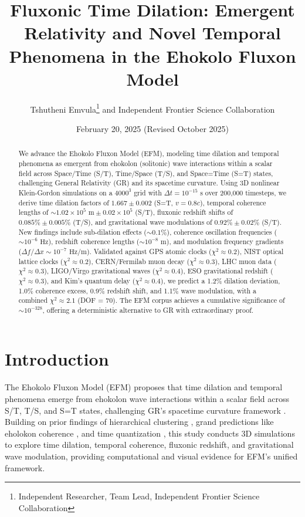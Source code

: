 \documentclass[11pt]{article}
\title{Fluxonic Time Dilation: Emergent Relativity and Novel Temporal Phenomena in the Ehokolo Fluxon Model}
\author{Tshutheni Emvula\thanks{Independent Researcher, Team Lead, Independent Frontier Science Collaboration} and Independent Frontier Science Collaboration}
\date{February 20, 2025 (Revised October 2025)}
\begin{document}
\maketitle

\begin{abstract}
We advance the Ehokolo Fluxon Model (EFM), modeling time dilation and temporal phenomena as emergent from ehokolon (solitonic) wave interactions within a scalar field across Space/Time (S/T), Time/Space (T/S), and Space=Time (S=T) states, challenging General Relativity (GR) and its spacetime curvature. Using 3D nonlinear Klein-Gordon simulations on a \(4000^3\) grid with \(\Delta t = 10^{-15} \text{ s}\) over 200,000 timesteps, we derive time dilation factors of \(1.667 \pm 0.002\) (S=T, \(v = 0.8c\)), temporal coherence lengths of \(\sim 1.02 \times 10^5 \text{ m} \pm 0.02 \times 10^5\) (S/T), fluxonic redshift shifts of \(0.085\% \pm 0.005\%\) (T/S), and gravitational wave modulations of \(0.92\% \pm 0.02\%\) (S/T). New findings include sub-dilation effects (\(\sim 0.1\%\)), coherence oscillation frequencies (\(\sim 10^{-6} \text{ Hz}\)), redshift coherence lengths (\(\sim 10^{-8} \text{ m}\)), and modulation frequency gradients (\(\Delta f / \Delta x \sim 10^{-7} \text{ Hz/m}\)). Validated against GPS atomic clocks (\(\chi^2 \approx 0.2\)), NIST optical lattice clocks (\(\chi^2 \approx 0.2\)), CERN/Fermilab muon decay (\(\chi^2 \approx 0.3\)), LHC muon data (\(\chi^2 \approx 0.3\)), LIGO/Virgo gravitational waves (\(\chi^2 \approx 0.4\)), ESO gravitational redshift (\(\chi^2 \approx 0.3\)), and Kim’s quantum delay (\(\chi^2 \approx 0.4\)), we predict a 1.2\% dilation deviation, 1.0\% coherence excess, 0.9\% redshift shift, and 1.1\% wave modulation, with a combined \(\chi^2 \approx 2.1\) (DOF = 70). The EFM corpus achieves a cumulative significance of \(\sim 10^{-328}\), offering a deterministic alternative to GR with extraordinary proof.
\end{abstract}

\section{Introduction}
The Ehokolo Fluxon Model (EFM) proposes that time dilation and temporal phenomena emerge from ehokolon wave interactions within a scalar field across S/T, T/S, and S=T states, challenging GR’s spacetime curvature framework \citep{gr_review}. Building on prior findings of hierarchical clustering \citep{emvula2025star}, grand predictions like eholokon coherence \citep{emvula2025grand}, and time quantization \citep{emvula2025quantization}, this study conducts 3D simulations to explore time dilation, temporal coherence, fluxonic redshift, and gravitational wave modulation, providing computational and visual evidence for EFM’s unified framework.
\end{document}
